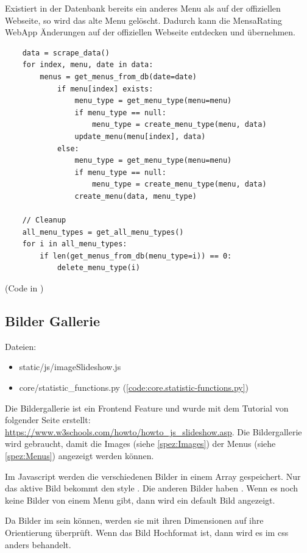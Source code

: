 Existiert in der Datenbank bereits ein anderes Menu als auf der offiziellen
Webseite, so wird das alte Menu gelöscht. Dadurch kann die MensaRating WebApp
Änderungen auf der offiziellen Webseite entdecken und übernehmen.

\begin{lstlisting}
    data = scrape_data()
    for index, menu, date in data:
        menus = get_menus_from_db(date=date)
            if menu[index] exists:
                menu_type = get_menu_type(menu=menu)
                if menu_type == null:
                    menu_type = create_menu_type(menu, data)
                update_menu(menu[index], data)
            else:
                menu_type = get_menu_type(menu=menu)
                if menu_type == null:
                    menu_type = create_menu_type(menu, data)
                create_menu(data, menu_type)
    
    // Cleanup
    all_menu_types = get_all_menu_types()
    for i in all_menu_types:
        if len(get_menus_from_db(menu_type=i)) == 0:
            delete_menu_type(i)
\end{lstlisting}

(Code in )

\subsection{Bilder Gallerie} \label{spez:Gallerie}

Dateien:
\begin{itemize}
    \item static/js/imageSlideshow.js
    \item core/statistic\_functions.py (\ref{code:core.statistic-functions.py})
\end{itemize}

Die Bildergallerie ist ein Frontend Feature und wurde mit dem Tutorial von
folgender Seite erstellt:
\url{https://www.w3schools.com/howto/howto_js_slideshow.asp}. Die Bildergallerie
wird gebraucht, damit die Images (siehe \ref{spez:Images}) der Menus (siehe
\ref{spez:Menus}) angezeigt werden können.

Im Javascript werden die verschiedenen Bilder in einem Array gespeichert. Nur
das aktive Bild bekommt den style . Die anderen Bilder
haben . Wenn es noch keine Bilder von einem Menu gibt, dann
wird ein default Bild angezeigt.

Da Bilder im  sein können, werden sie mit ihren Dimensionen
auf ihre Orientierung überprüft. Wenn das Bild Hochformat ist, dann wird es im
css anders behandelt.

